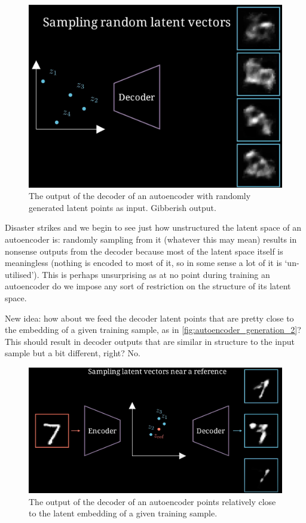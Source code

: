 \documentclass[11pt]{article}
\begin{document}
\begin{figure}[t]
    \centering
    \includegraphics[width=0.60\columnwidth]{./figures/generative_models/AE_gen_1.png}
    \caption{The output of the decoder of an autoencoder with randomly generated latent points as input. Gibberish output. }
    \label{fig:autoencoder_generation_1}
\end{figure}

\noindent Disaster strikes and we begin to see just how unstructured the latent space of an autoencoder is: randomly sampling from it (whatever this may mean) results in nonsense outputs from the decoder because most of the latent space itself is meaningless (nothing is encoded to most of it, so in some sense a lot of it is `un-utilised'). This is perhaps unsurprising as at no point during training an autoencoder do we impose any sort of restriction on the structure of its latent space.

New idea: how about we feed the decoder latent points that are pretty close to the embedding of a given training sample, as in \autoref{fig:autoencoder_generation_2}? This should result in decoder outputs that are similar in structure to the input sample but a bit different, right? No.

\begin{figure}[t]
    \centering
    \includegraphics[width=0.75\columnwidth]{./figures/generative_models/AE_gen_2.png}
    \caption{The output of the decoder of an autoencoder points relatively close to the latent embedding of a given training sample. }
    \label{fig:autoencoder_generation_2}
\end{figure}
\end{document}
